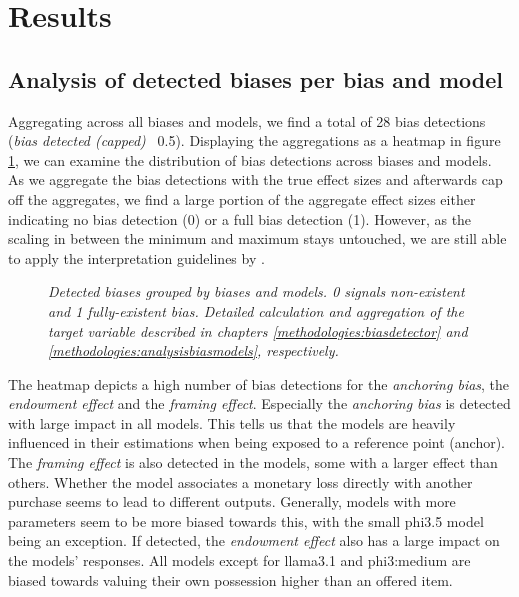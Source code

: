 \section{Results}
\label{chapter:results}

\subsection{Analysis of detected biases per bias and model}
\par Aggregating across all biases and models, we find a total of 28 bias detections (\textit{bias detected (capped)} \geq\, 0.5). Displaying the aggregations as a heatmap in figure \ref{fig:detections-heatmap}, we can examine the distribution of bias detections across biases and models. As we aggregate the bias detections with the true effect sizes and afterwards cap off the aggregates, we find a large portion of the aggregate effect sizes either indicating no bias detection (0) or a full bias detection (1). However, as the scaling in between the minimum and maximum stays untouched, we are still able to apply the interpretation guidelines by \textcite{cohen1988statistical}.

\begin{figure}[htbp]
    \centering
    
    \caption[Heatmap of bias detections grouped by biases and models]{\centering \textit{Detected biases grouped by biases and models. 0 signals non-existent and 1 fully-existent bias. Detailed calculation and aggregation of the target variable described in chapters \ref{methodologies:biasdetector} and \ref{methodologies:analysisbiasmodels}, respectively.}}
    \label{fig:detections-heatmap}
\end{figure}

\par The heatmap depicts a high number of bias detections for the \textit{anchoring bias}, the \textit{endowment effect} and the \textit{framing effect}. Especially the \textit{anchoring bias} is detected with large impact in all models. This tells us that the models are heavily influenced in their estimations when being exposed to a reference point (anchor). The \textit{framing effect} is also detected in the models, some with a larger effect than others. Whether the model associates a monetary loss directly with another purchase seems to lead to different outputs. Generally, models with more parameters seem to be more biased towards this, with the small phi3.5 model being an exception. If detected, the \textit{endowment effect} also has a large impact on the models' responses. All models except for llama3.1 and phi3:medium are biased towards valuing their own possession higher than an offered item.

